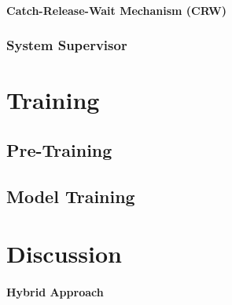 \documentclass{article}
\begin{document}
	\paragraph{Catch-Release-Wait Mechanism (CRW)}

	\subsubsection{System Supervisor}

	\section{Training}

	\subsection{Pre-Training}

	\subsection{Model Training}

	\section{Discussion}

	\paragraph{Hybrid Approach}
\end{document}
